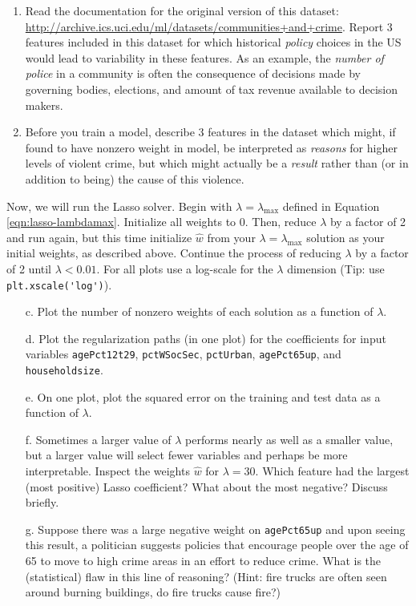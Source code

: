 \documentclass{article}
\begin{document}
  
\begin{aprob} 
    
    \begin{enumerate}
        \item {} Read the documentation for the original version of this dataset: \url{http://archive.ics.uci.edu/ml/datasets/communities+and+crime}. Report 3 features included in this dataset for which historical \emph{policy} choices in the US would lead to variability in these features. As an example, the \emph{number of police} in a community is often the consequence of decisions made by governing bodies, elections, and amount of tax revenue available to decision makers.
        \item {} Before you train a model, describe 3 features in the dataset which might, if found to have nonzero weight in model, be interpreted as \emph{reasons} for higher levels of violent crime, but which might actually be a \emph{result} rather than (or in addition to being) the cause of this violence.
    \end{enumerate}

    Now, we will run the Lasso solver. Begin with $\lambda = \lambda_{\max}$ defined in Equation \eqref{eqn:lasso-lambdamax}. Initialize all weights to $0$. Then, reduce $\lambda$ by a factor of 2 and run again, but this time initialize $\hat{{w}}$ from your $\lambda = \lambda_{\max}$ solution as your initial weights, as described above. Continue the process of reducing $\lambda$ by a factor of 2 until $\lambda < 0.01$.
    For all plots use a log-scale for the $\lambda$ dimension (Tip: use
    \verb|plt.xscale('log')|).
    \\
    
    
    \begin{enumerate}
        \item[c.]  Plot the number of nonzero weights of each solution as a function of $\lambda$.
        \item[d.]  Plot the regularization paths (in one plot) for the coefficients for input variables \texttt{agePct12t29}, \texttt{pctWSocSec}, \texttt{pctUrban}, \texttt{agePct65up}, and \texttt{householdsize}.
        \item[e.]  On one plot, plot the squared error on the training and test data as a function of $\lambda$.
        \item[f.]  Sometimes a larger value of $\lambda$ performs nearly as well as a smaller value, but a larger value will select fewer variables and perhaps be more interpretable.  Inspect the weights $\hat{w}$ for $\lambda = 30$.  Which feature had the largest (most positive) Lasso coefficient? What about the most negative? Discuss briefly.
        \item[g.]  Suppose there was a large negative weight on \texttt{agePct65up} and upon seeing this result, a politician suggests policies that encourage people over the age of 65 to move to high crime areas in an effort to reduce crime. What is the (statistical) flaw in this line of reasoning? (Hint: fire trucks
        are often seen around burning buildings, do fire trucks cause fire?)
    \end{enumerate}  


\end{aprob}
\end{document}
